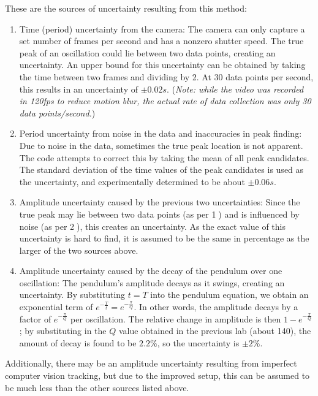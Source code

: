 \documentclass[aps,twocolumn,secnumarabic,nobalancelastpage,amsmath,amssymb,nofootinbib]{revtex4}
\begin{document}
These are the sources of uncertainty resulting from this method:
\begin{enumerate}
    \item Time (period) uncertainty from the camera: The camera can only capture a set number of frames per second and
          has a nonzero shutter speed. The true peak of an oscillation could lie between two data points, creating an
          uncertainty. An upper bound for this uncertainty can be obtained by taking the time between two frames and
          dividing by 2. At 30 data points per second, this results in an uncertainty of \(\pm 0.02\si{s}\).
          (\textit{Note: while the video was recorded in 120fps to reduce motion blur, the actual rate of data
          collection was only 30 data points/second.})
    \item Period uncertainty from noise in the data and inaccuracies in peak finding: Due to noise in the data,
          sometimes the true peak location is not apparent. The code attempts to correct this by taking the mean of all
          peak candidates. The standard deviation of the time values of the peak candidates is used as the uncertainty,
          and experimentally determined to be about \(\pm 0.06\si{s}\).
    \item Amplitude uncertainty caused by the previous two uncertainties: Since the true peak may lie between two data
          points (as per \textcircled{1}) and is influenced by noise (as per \textcircled{2}), this creates an
          uncertainty. As the exact value of this uncertainty is hard to find, it is assumed to be the same in
          percentage as the larger of the two sources above.
    \item Amplitude uncertainty caused by the decay of the pendulum over one oscillation: The pendulum's amplitude
          decays as it swings, creating an uncertainty. By substituting $t = T$ into the pendulum equation, we obtain
          an exponential term of $e^{-\frac{T}{t}} = e^{-\frac{\pi}{Q}}$. In other words, the amplitude decays by a
          factor of $e^{-\frac{\pi}{Q}}$ per oscillation. The relative change in amplitude is then
          $1 - e^{-\frac{\pi}{Q}}$; by substituting in the $Q$ value obtained in the previous lab (about 140), the
          amount of decay is found to be $2.2\%$, so the uncertainty is \(\pm 2\%\).
\end{enumerate}

Additionally, there may be an amplitude uncertainty resulting from imperfect computer vision tracking, but due to the
improved setup, this can be assumed to be much less than the other sources listed above.
\end{document}
